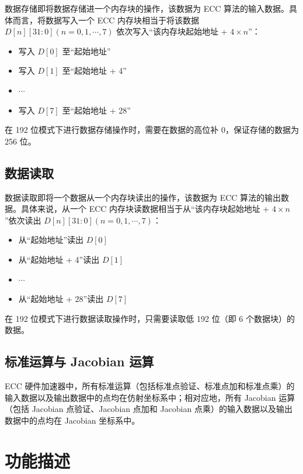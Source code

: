 \documentclass[main\_\_CN.tex]{subfiles}
\begin{document}
数据存储即将数据存储进一个内存块的操作，该数据为 ECC 算法的输入数据。具体而言，将数据写入一个 ECC 内存块相当于将该数据 $D[n][31:0] (n=0, 1, \cdots, 7)$ 依次写入“该内存块起始地址 + $4 \times n$”：

\begin{itemize}
    \item 写入 $D[0]$ 至“起始地址”
    \item 写入 $D[1]$ 至“起始地址 + 4”
    \item $\cdots$
    \item 写入 $D[7]$ 至“起始地址 + 28”
\end{itemize}

\begin{tiplisting}
在 192 位模式下进行数据存储操作时，需要在数据的高位补 0，保证存储的数据为 256 位。
\end{tiplisting}

\subsection{数据读取}

数据读取即将一个数据从一个内存块读出的操作，该数据为 ECC 算法的输出数据。具体来说，从一个 ECC 内存块读数据相当于从“该内存块起始地址 + $4 \times n$”依次读出 $D[n][31:0] (n=0, 1, \cdots, 7)$：
\begin{itemize}
    \item 从“起始地址”读出 $D[0]$
    \item 从“起始地址 + 4”读出 $D[1]$
    \item $\cdots$
    \item 从“起始地址 + 28”读出 $D[7]$
\end{itemize}

\begin{tiplisting}
在 192 位模式下进行数据读取操作时，只需要读取低 192 位（即 6 个数据块）的数据。
\end{tiplisting}


\subsection{标准运算与 Jacobian 运算}

\chipname{} ECC 硬件加速器中，所有标准运算（包括标准点验证、标准点加和标准点乘）的输入数据以及输出数据中的点均在仿射坐标系中；相对应地，所有 Jacobian 运算（包括 Jacobian 点验证、Jacobian 点加和 Jacobian 点乘）的输入数据以及输出数据中的点均在 Jacobian 坐标系中。

\section{功能描述}
\label{sec:ecc-mode-config}
\end{document}
